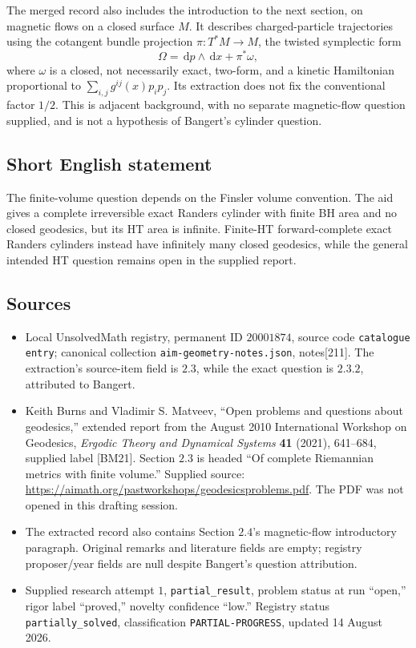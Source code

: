 \documentclass[11pt]{article}
\newcommand{\dd}{\,\mathrm{d}}
\begin{document}
The merged record also includes the introduction to the next section, on magnetic flows on a closed surface \(M\). It describes charged-particle trajectories using the cotangent bundle projection \(\pi:T^*M\to M\), the twisted symplectic form
\[
 \Omega=\dd p\wedge\dd x+\pi^*\omega,
\]
where \(\omega\) is a closed, not necessarily exact, two-form, and a kinetic Hamiltonian proportional to \(\sum_{i,j}g^{ij}(x)p_i p_j\). Its extraction does not fix the conventional factor \(1/2\). This is adjacent background, with no separate magnetic-flow question supplied, and is not a hypothesis of Bangert's cylinder question.
\subsection{Short English statement}
The finite-volume question depends on the Finsler volume convention. The aid gives a complete irreversible exact Randers cylinder with finite BH area and no closed geodesics, but its HT area is infinite. Finite-HT forward-complete exact Randers cylinders instead have infinitely many closed geodesics, while the general intended HT question remains open in the supplied report.
\subsection{Sources}
\begin{itemize}
\item Local UnsolvedMath registry, permanent ID \(20001874\), source code \texttt{catalogue entry}; canonical collection \texttt{aim-geometry-notes.json}, notes[211]. The extraction's source-item field is \(2.3\), while the exact question is \(2.3.2\), attributed to Bangert.
\item Keith Burns and Vladimir S. Matveev, ``Open problems and questions about geodesics,'' extended report from the August 2010 International Workshop on Geodesics, \emph{Ergodic Theory and Dynamical Systems} \textbf{41} (2021), 641--684, supplied label [BM21]. Section \(2.3\) is headed ``Of complete Riemannian metrics with finite volume.'' Supplied source: \url{https://aimath.org/pastworkshops/geodesicsproblems.pdf}. The PDF was not opened in this drafting session.
\item The extracted record also contains Section \(2.4\)'s magnetic-flow introductory paragraph. Original remarks and literature fields are empty; registry proposer/year fields are null despite Bangert's question attribution.
\item Supplied research attempt \(1\), \texttt{partial\_result}, problem status at run ``open,'' rigor label ``proved,'' novelty confidence ``low.'' Registry status \texttt{partially\_solved}, classification \texttt{PARTIAL-PROGRESS}, updated 14 August 2026.
\end{itemize}
\end{document}
